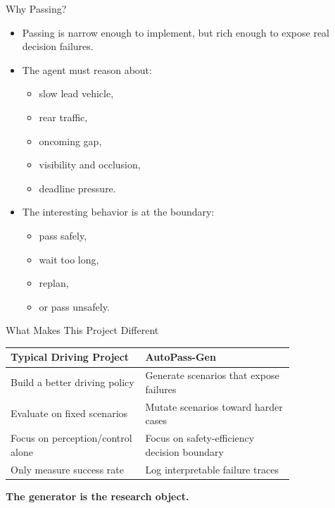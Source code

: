 \documentclass[aspectratio=169,11pt]{beamer}
\begin{document}
\begin{frame}{Why Passing?}
\begin{itemize}
\item Passing is narrow enough to implement, but rich enough to expose real decision failures.

\pause

\item The agent must reason about:
\begin{itemize}
\item slow lead vehicle,
\item rear traffic,
\item oncoming gap,
\item visibility and occlusion,
\item deadline pressure.
\end{itemize}

\pause

\item The interesting behavior is at the boundary:
\begin{itemize}
\item pass safely,
\item wait too long,
\item replan,
\item or pass unsafely.
\end{itemize}
\end{itemize}
\end{frame}

\begin{frame}{What Makes This Project Different}
\begin{center}
\small
\begin{tabular}{p{0.38\linewidth}|p{0.42\linewidth}}
\textbf{Typical Driving Project} & \textbf{AutoPass-Gen} \\
\hline
Build a better driving policy & Generate scenarios that expose failures \\
Evaluate on fixed scenarios & Mutate scenarios toward harder cases \\
Focus on perception/control alone & Focus on safety-efficiency decision boundary \\
Only measure success rate & Log interpretable failure traces \\
\end{tabular}
\end{center}

\vspace{12pt}
\begin{center}
\Large
\textbf{The generator is the research object.}
\end{center}
\end{frame}
\end{document}
